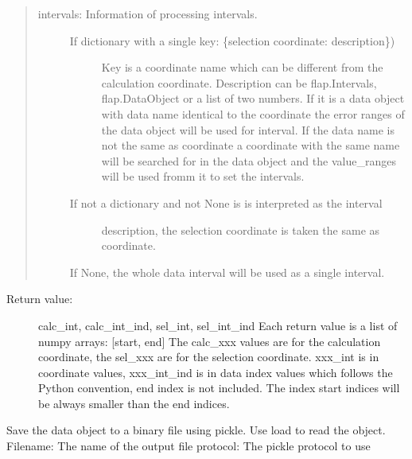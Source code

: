 \documentclass[letterpaper,10pt,english]{sphinxmanual}
\begin{document}
\begin{fulllineitems}
\begin{fulllineitems}
\begin{quote}
\begin{description}
\item[{intervals: Information of processing intervals.}] \leavevmode\begin{description}
\item[{If dictionary with a single key: \{selection coordinate: description\})}] \leavevmode
Key is a coordinate name which can be different from the calculation
coordinate.
Description can be flap.Intervals, flap.DataObject or
a list of two numbers. If it is a data object with data name identical to
the coordinate the error ranges of the data object will be used for
interval. If the data name is not the same as coordinate a coordinate with the
same name will be searched for in the data object and the value\_ranges
will be used fromm it to set the intervals.

\item[{If not a dictionary and not None is is interpreted as the interval}] \leavevmode
description, the selection coordinate is taken the same as
coordinate.

\end{description}

If None, the whole data interval will be used as a single interval.

\end{description}
\end{quote}
\begin{description}
\item[{Return value:}] \leavevmode
calc\_int, calc\_int\_ind, sel\_int, sel\_int\_ind
Each return value is a list of numpy arrays: {[}start, end{]}
The calc\_xxx values are for the calculation coordinate, the sel\_xxx are for the
selection coordinate. xxx\_int is in coordinate values, xxx\_int\_ind is in data index
values which follows the Python convention, end index is not included.
The index start indices will be always smaller than the end indices.

\end{description}

\end{fulllineitems}


\begin{fulllineitems}
\label{\detokenize{data_object:flap.data_object.DataObject.save}}
Save the data object to a binary file using pickle.
Use load to read the object.
Filename: The name of the output file
protocol: The pickle protocol to use


\end{fulllineitems}
\end{fulllineitems}
\end{document}
